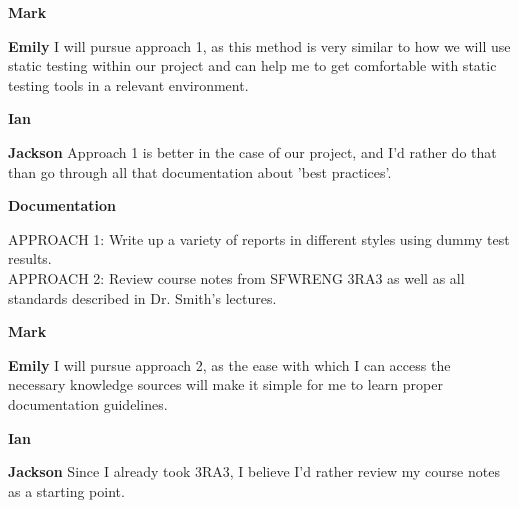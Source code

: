 \documentclass[12pt, titlepage]{article}
\begin{document}
\begin{enumerate}[leftmargin=*]
  \textbf{Mark}

  \textbf{Emily} I will pursue approach 1, as this method is very similar to how we will use static testing within our project and can help me to get comfortable with static testing tools in a relevant environment.

  \textbf{Ian}

  \textbf{Jackson} Approach 1 is better in the case of our project, and I'd rather do that than go through all that documentation about 'best practices'.

  \vspace{10pt}
  \textbf{Documentation}

  APPROACH 1: Write up a variety of reports in different styles using dummy test results. \\
  APPROACH 2: Review course notes from SFWRENG 3RA3 as well as all standards described in Dr. Smith’s lectures.

  \textbf{Mark}

  \textbf{Emily} I will pursue approach 2, as the ease with which I can access the necessary knowledge sources will make it simple for me to learn proper documentation guidelines.

  \textbf{Ian}

  \textbf{Jackson} Since I already took 3RA3, I believe I'd rather review my course notes as a starting point.

\end{enumerate}
\end{document}

